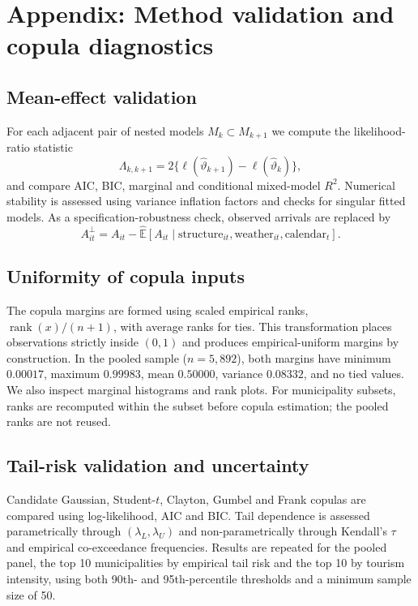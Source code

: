 \documentclass[11pt,a4paper]{article}
\begin{document}
\appendix

\section{Appendix: Method validation and copula diagnostics}
\label{app:method-validation}

\subsection{Mean-effect validation}
For each adjacent pair of nested models $M_k \subset M_{k+1}$ we compute the likelihood-ratio statistic
\[
\Lambda_{k,k+1}=2\{\ell(\widehat{\vartheta}_{k+1})-\ell(\widehat{\vartheta}_{k})\},
\]
and compare AIC, BIC, marginal and conditional mixed-model $R^2$. Numerical stability is assessed using variance inflation factors and checks for singular fitted models. As a specification-robustness check, observed arrivals are replaced by
\begin{equation}
\label{eq:atres}
A^{\perp}_{it}=A_{it}-\widehat{\mathbb{E}}\left[A_{it}\mid\text{structure}_{it},\text{weather}_{it},\text{calendar}_{t}\right].
\end{equation}

\subsection{Uniformity of copula inputs}
\label{app:copula-diagnostics}
The copula margins are formed using scaled empirical ranks, $\operatorname{rank}(x)/(n+1)$, with average ranks for ties. This transformation places observations strictly inside $(0,1)$ and produces empirical-uniform margins by construction. In the pooled sample ($n=5{,}892$), both margins have minimum $0.00017$, maximum $0.99983$, mean $0.50000$, variance $0.08332$, and no tied values. We also inspect marginal histograms and rank plots. For municipality subsets, ranks are recomputed within the subset before copula estimation; the pooled ranks are not reused.

\subsection{Tail-risk validation and uncertainty}
\label{app:tail-validation}
Candidate Gaussian, Student-$t$, Clayton, Gumbel and Frank copulas are compared using log-likelihood, AIC and BIC. Tail dependence is assessed parametrically through $(\lambda_L,\lambda_U)$ and non-parametrically through Kendall's $\tau$ and empirical co-exceedance frequencies. Results are repeated for the pooled panel, the top 10 municipalities by empirical tail risk and the top 10 by tourism intensity, using both 90th- and 95th-percentile thresholds and a minimum sample size of 50.
\end{document}
